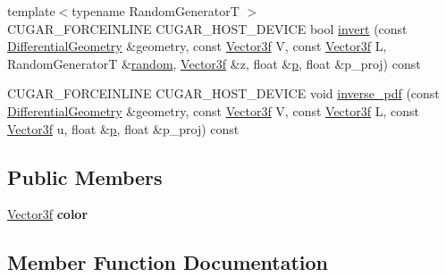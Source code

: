 \begin{DoxyCompactItemize}
\item 
{\footnotesize template$<$typename Random\+GeneratorT $>$ }\\C\+U\+G\+A\+R\+\_\+\+F\+O\+R\+C\+E\+I\+N\+L\+I\+NE C\+U\+G\+A\+R\+\_\+\+H\+O\+S\+T\+\_\+\+D\+E\+V\+I\+CE bool \hyperlink{structcugar_1_1_lambert_edf_ae3d6b75902074a76f918a8d8d2bba24e}{invert} (const \hyperlink{structcugar_1_1_differential_geometry}{Differential\+Geometry} \&geometry, const \hyperlink{structcugar_1_1_vector}{Vector3f} V, const \hyperlink{structcugar_1_1_vector}{Vector3f} L, Random\+GeneratorT \&\hyperlink{group___sampling_module_gaec17bbbfd36295353081b7b4480d933d}{random}, \hyperlink{structcugar_1_1_vector}{Vector3f} \&z, float \&\hyperlink{structcugar_1_1_lambert_edf_a388560f22fa74fe55678388ea0ae7f69}{p}, float \&p\+\_\+proj) const
\item 
C\+U\+G\+A\+R\+\_\+\+F\+O\+R\+C\+E\+I\+N\+L\+I\+NE C\+U\+G\+A\+R\+\_\+\+H\+O\+S\+T\+\_\+\+D\+E\+V\+I\+CE void \hyperlink{structcugar_1_1_lambert_edf_acc3121156681c4433b1e85ae2de74605}{inverse\+\_\+pdf} (const \hyperlink{structcugar_1_1_differential_geometry}{Differential\+Geometry} \&geometry, const \hyperlink{structcugar_1_1_vector}{Vector3f} V, const \hyperlink{structcugar_1_1_vector}{Vector3f} L, const \hyperlink{structcugar_1_1_vector}{Vector3f} u, float \&\hyperlink{structcugar_1_1_lambert_edf_a388560f22fa74fe55678388ea0ae7f69}{p}, float \&p\+\_\+proj) const
\end{DoxyCompactItemize}
\subsection*{Public Members}
\begin{DoxyCompactItemize}
\item 
\mbox{\label{structcugar_1_1_lambert_edf_a7b02006203dafed67b6ae7edb6293a66}} 
\hyperlink{structcugar_1_1_vector}{Vector3f} {\bfseries color}
\end{DoxyCompactItemize}


\subsection{Member Function Documentation}
\mbox{\label{structcugar_1_1_lambert_edf_aed2fed71aa6a7ad98e05714a0fd5f316}} 
